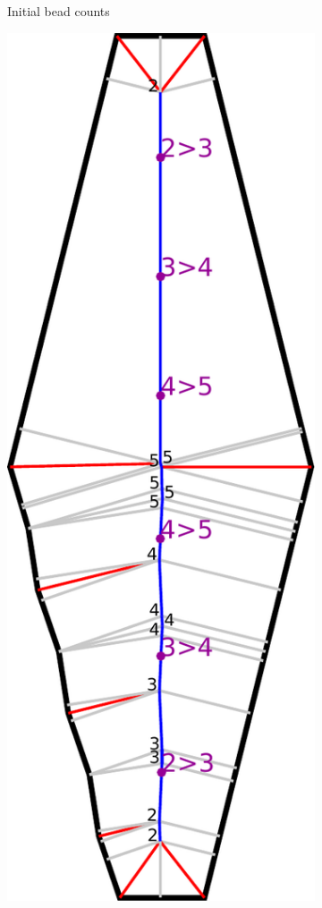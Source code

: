 \begin{figure}
\begin{subfigure}{\figwidth}
\caption{Initial bead counts}\label{beading_transitioning_filtering__bead_count}
\end{subfigure}
\begin{subfigure}{\figwidth}
\includegraphics[width=\columnwidth]{sources/method/beading_transitioning_filtering__transition_mids.pdf}

\end{subfigure}
\end{figure}
